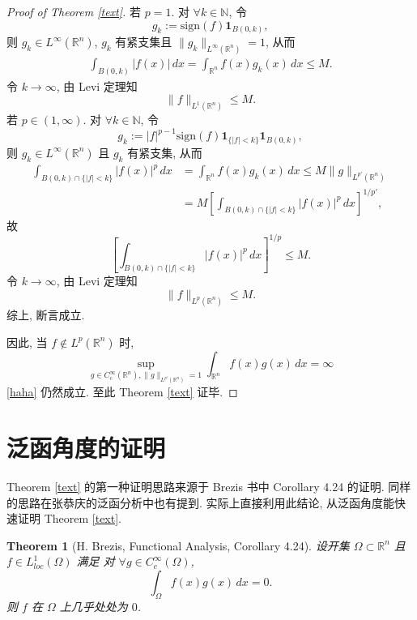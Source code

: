 \documentclass[a4paper,11pt]{article}
\newtheorem{theorem}{Theorem}[section]
\theoremstyle{definition}
\begin{document}
\begin{proof}[Proof of Theorem \ref{text}]
    若 $ p = 1 $. 对 $ \forall k \in \mathbb{N} $, 令
    $$
        g_k := \mathrm{sign} (f) \mathbf{1}_{B(0, k)},
    $$
    则 $ g_k \in L^\infty(\mathbb{R}^n) $, $ g_k $ 有紧支集且 $ \|g_k\|_{L^\infty(\mathbb{R}^n)} = 1 $, 从而
    \begin{align*}
        \int_{B(0, k)} |f(x)| \, dx
            = \int_{\mathbb{R}^n} f(x) g_k(x) \, dx
            \leq M.
    \end{align*}
    令 $ k \to \infty $, 由 Levi 定理知
    $$
        \| f \|_{L^1(\mathbb{R}^n)} \leq M.
    $$
    若 $ p \in (1, \infty) $. 对 $ \forall k \in \mathbb{N} $, 令
    $$
        g_k := |f|^{p-1} \mathrm{sign}(f) \mathbf{1}_{\{|f| < k\}} \mathbf{1}_{B(0, k)},
    $$
    则 $ g_k \in L^\infty(\mathbb{R}^n) $ 且 $ g_k $ 有紧支集, 从而
    \begin{align*}
        \int_{B(0, k) \cap \{|f| < k\}} |f(x)|^p \, dx
            &= \int_{\mathbb{R}^n} f(x) g_k(x) \, dx
            \leq M \| g \|_{L^{p'}(\mathbb{R}^n)} \\
            &= M \left[ \int_{B(0, k) \cap \{|f| < k\}} |f(x)|^p \, dx \right]^{1/p'},
    \end{align*}
    故
    $$
        \left[ \int_{B(0, k) \cap \{|f| < k\}} |f(x)|^p \, dx \right]^{1/p} \leq M.
    $$
    令 $ k \to \infty $, 由 Levi 定理知
    $$
        \| f \|_{L^p(\mathbb{R}^n)} \leq M.
    $$
    综上, 断言成立.
    
    因此, 当 $ f \notin L^p(\mathbb{R}^n) $ 时,
    $$
        \sup_{g \in C_c^\infty(\mathbb{R}^n), \| g \|_{L^{p'}(\mathbb{R}^n)} = 1} 
            \int_{\mathbb{R}^n} f(x) g(x) \, dx = \infty
    $$
    \eqref{haha} 仍然成立. 至此 Theorem \ref{text} 证毕.
\end{proof}

\section{泛函角度的证明}

Theorem \ref{text} 的第一种证明思路来源于 Brezis 书中 Corollary 4.24 的证明. 同样的思路在张恭庆的泛函分析中也有提到.
实际上直接利用此结论, 从泛函角度能快速证明 Theorem \ref{text}.

\begin{theorem}[H. Brezis, Functional Analysis, Corollary 4.24] \label{h}
    设开集 $ \Omega \subset \mathbb{R}^n $ 且 $ f \in L^1_{loc}(\Omega) $ 满足
    对 $ \forall g \in C_c^\infty(\Omega) $,
    $$
        \int_\Omega f(x) g(x) \, dx = 0.
    $$
    则 $ f $ 在 $ \Omega $ 上几乎处处为 $ 0 $.
\end{theorem}
\end{document}
